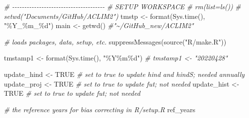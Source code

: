\documentclass[
]{article}
\newenvironment{Shaded}{\begin{snugshade}}{\end{snugshade}}
\newcommand{\CommentTok}[1]{\textcolor[rgb]{0.56,0.35,0.01}{\textit{#1}}}
\newcommand{\ConstantTok}[1]{\textcolor[rgb]{0.00,0.00,0.00}{#1}}
\newcommand{\FunctionTok}[1]{\textcolor[rgb]{0.00,0.00,0.00}{#1}}
\newcommand{\NormalTok}[1]{#1}
\newcommand{\OtherTok}[1]{\textcolor[rgb]{0.56,0.35,0.01}{#1}}
\newcommand{\StringTok}[1]{\textcolor[rgb]{0.31,0.60,0.02}{#1}}
\begin{document}
\begin{Shaded}
\begin{Highlighting}[]
    \CommentTok{\# {-}{-}{-}{-}{-}{-}{-}{-}{-}{-}{-}{-}{-}{-}{-}{-}{-}{-}{-}{-}{-}{-}{-}{-}{-}{-}{-}{-}{-}{-}{-}{-}{-}{-}{-}{-}{-}{-}}
    \CommentTok{\# SETUP WORKSPACE}
    \CommentTok{\# rm(list=ls())}
    \CommentTok{\# setwd("Documents/GitHub/ACLIM2")}
\NormalTok{    tmstp  }\OtherTok{\textless{}{-}} \FunctionTok{format}\NormalTok{(}\FunctionTok{Sys.time}\NormalTok{(), }\StringTok{"\%Y\_\%m\_\%d"}\NormalTok{)}
\NormalTok{    main   }\OtherTok{\textless{}{-}} \FunctionTok{getwd}\NormalTok{()  }\CommentTok{\#"\textasciitilde{}/GitHub\_new/ACLIM2"}
    
    \CommentTok{\# loads packages, data, setup, etc.}
    \FunctionTok{suppressMessages}\NormalTok{(}\FunctionTok{source}\NormalTok{(}\StringTok{"R/make.R"}\NormalTok{))}
    
\NormalTok{    tmstamp1  }\OtherTok{\textless{}{-}} \FunctionTok{format}\NormalTok{(}\FunctionTok{Sys.time}\NormalTok{(), }\StringTok{"\%Y\%m\%d"}\NormalTok{)}
    \CommentTok{\# tmstamp1  \textless{}{-} "20220428"}
    
\NormalTok{    update\_hind  }\OtherTok{\textless{}{-}} \ConstantTok{TRUE}   \CommentTok{\# set to true to update hind and hindS; needed annually}
\NormalTok{    update\_proj  }\OtherTok{\textless{}{-}} \ConstantTok{TRUE}   \CommentTok{\# set to true to update fut; not needed}
\NormalTok{    update\_hist  }\OtherTok{\textless{}{-}} \ConstantTok{TRUE}   \CommentTok{\# set to true to update fut; not needed}
     
    \CommentTok{\# the reference years for bias correcting in R/setup.R}
\NormalTok{    ref\_years }
    

\end{Highlighting}
\end{Shaded}
\end{document}
